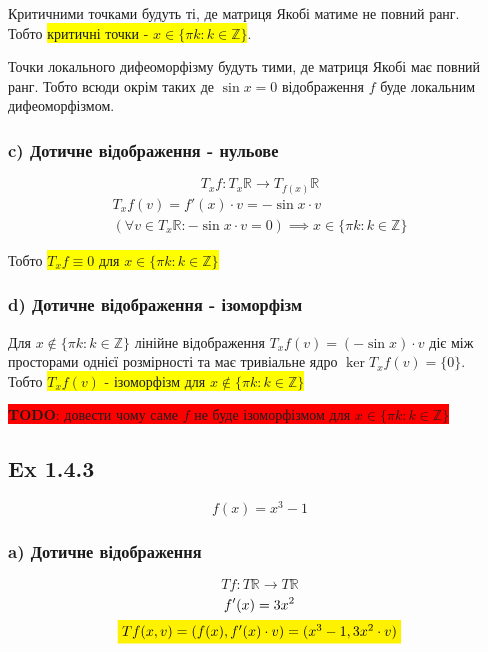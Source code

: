 \documentclass[10pt, a4paper]{article} %
\newcommand{\R}{\mathbb{R}}
\newcommand{\todo}[1]{\colorbox{red}{\textbf{TODO}: #1}}
\begin{document}
Критичними точками будуть ті, де матриця Якобі матиме не повний ранг.\\
Тобто \colorbox{yellow}{критичні точки - $x \in \{\pi k : k\in\mathbb Z\}$}.

Точки локального дифеоморфізму будуть тими, де матриця Якобі має повний ранг.
Тобто всюди окрім таких де $\sin x = 0$ відображення $f$ буде локальним дифеоморфізмом.

\subsubsection*{c) Дотичне відображення - нульове}
\[T_{x}f : T_{x}\R \to T_{f(x)}\R\]
\begin{gather*}
    T_{x}f(v) = f'(x) \cdot v = -\sin x \cdot v\\
    \left(\forall v\in T_{x}\R: -\sin x \cdot v = 0\right) \implies  x \in \{\pi k : k\in\mathbb Z\}
\end{gather*}

Тобто \colorbox{yellow}{$T_{x}f \equiv 0$ для $x \in \{\pi k : k\in\mathbb Z\}$}

\subsubsection*{d) Дотичне відображення - ізоморфізм}

Для $x \notin \{\pi k : k\in\mathbb Z\}$ лінійне відображення $T_{x}f(v) = (-\sin x) \cdot v$ діє між просторами однієї розмірності та має тривіальне ядро $\ker T_{x}f(v) = \{0\}$. \\
Тобто \colorbox{yellow}{$T_{x}f(v)$ - ізоморфізм для $x \notin \{\pi k : k\in\mathbb Z\}$}

\todo{довести чому саме $f$ не буде ізоморфізмом для $x \in \{\pi k : k\in\mathbb Z\}$}

\subsection*{Ex 1.4.3}
\begin{mdframed}
    \[f(x) = x^3 - 1\]
\end{mdframed}

\subsubsection*{a) Дотичне відображення}
\[Tf : T\R \to T\R\]
\begin{gather*}
    f'(x) = 3x^2\\
    \colorbox{yellow}{$Tf(x,v) = (f(x), f'(x)\cdot v) = (x^3-1, 3x^2 \cdot v)$}
\end{gather*}
\end{document}
